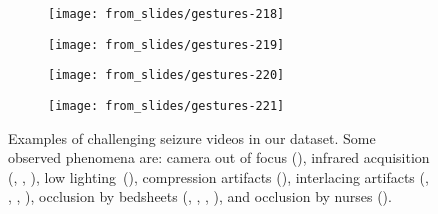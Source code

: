 \begin{figure}
  \centering

  \begin{subfigure}{0.48\linewidth}
    \texttt{[image: from\_slides/gestures-218]}
    \caption{\label{fig:gestures_video_1}}
  \end{subfigure}
  \hfill
  \begin{subfigure}{0.48\linewidth}
    \texttt{[image: from\_slides/gestures-219]}
    \caption{\label{fig:gestures_video_2}}
  \end{subfigure}

  \par\bigskip

  \begin{subfigure}{0.48\linewidth}
    \texttt{[image: from\_slides/gestures-220]}
    \caption{\label{fig:gestures_video_3}}
  \end{subfigure}
  \hfill
  \begin{subfigure}{0.48\linewidth}
    \texttt{[image: from\_slides/gestures-221]}
    \caption{\label{fig:gestures_video_4}}
  \end{subfigure}

  \caption[Examples of challenging seizure videos in our dataset]{
    Examples of challenging seizure videos in our dataset.
    Some observed phenomena are:
    camera out of focus (),
    infrared acquisition (, , ),
    low lighting~(),
    compression artifacts (),
    interlacing artifacts (, , , ),
    occlusion by bedsheets (, , , ),
    and occlusion by nurses ().
  }
  \label{fig:video_challenges}
\end{figure}

